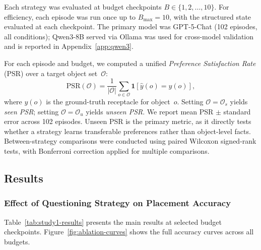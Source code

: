 \documentclass[manuscript,review,anonymous]{acmart}
\begin{document}
{Each strategy was evaluated at budget checkpoints $B \in \{1, 2, \dots, 10\}$. For efficiency, each episode was run once up to $B_{\max}=10$, with the structured state evaluated at each checkpoint. The primary model was GPT-5-Chat (102 episodes, all conditions); Qwen3-8B served via Ollama was used for cross-model validation and is reported in Appendix~\ref{app:qwen3}.

For each episode and budget, we computed a unified \textit{Preference Satisfaction Rate} (PSR) over a target object set~$\mathcal{O}$:
\begin{equation}
\label{eq:psr}
\mathrm{PSR}(\mathcal{O}) = \frac{1}{|\mathcal{O}|}\sum_{o \in \mathcal{O}} \mathbf{1}\!\left[\hat{y}(o)=y(o)\right],
\end{equation}
where $y(o)$ is the ground-truth receptacle for object~$o$. Setting $\mathcal{O}=\mathcal{O}_s$ yields \textit{seen PSR}; setting $\mathcal{O}=\mathcal{O}_u$ yields \textit{unseen PSR}. We report mean PSR $\pm$ standard error across 102 episodes. Unseen PSR is the primary metric, as it directly tests whether a strategy learns transferable preferences rather than object-level facts. Between-strategy comparisons were conducted using paired Wilcoxon signed-rank tests, with Bonferroni correction applied for multiple comparisons.

\subsection{Results}

\subsubsection{Effect of Questioning Strategy on Placement Accuracy}

Table~\ref{tab:study1-results} presents the main results at selected budget checkpoints. Figure~\ref{fig:ablation-curves} shows the full accuracy curves across all budgets.

}
\end{document}
